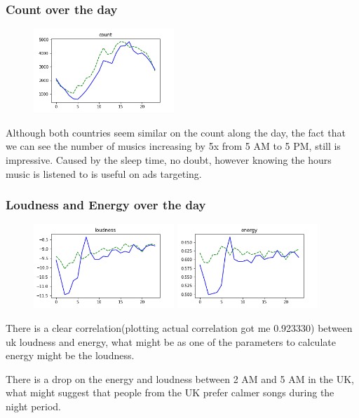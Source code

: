 \documentclass[a4paper]{article}
\begin{document}
\subsubsection{Count over the day}
\begin{figure}[h]
\centering
\includegraphics[width=200px]{count_daily.png}
\end{figure}
Although both countries seem similar on the count along the day, the fact that we can see the number of musics increasing by 5x from 5 AM to 5 PM, still is impressive. Caused by the sleep time, no doubt, however knowing the hours music is listened to is useful on ads targeting.

\subsubsection{Loudness and Energy over the day}
\begin{figure}[h]
\centering
\includegraphics[width=200px]{loudness_daily.png}
\includegraphics[width=200px]{energy_daily.png}
\end{figure}
There is a clear correlation(plotting actual correlation got me 0.923330) between uk loudness and energy, what might be as one of the parameters to calculate energy might be the loudness.

There is a drop on the energy and loudness between 2 AM and 5 AM in the UK, what might suggest that people from the UK prefer calmer songs during the night period.
\end{document}
